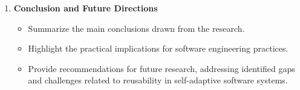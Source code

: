 \documentclass[a4paper, 12pt]{article}
\begin{document}
\begin{enumerate}
\begin{itemize}
    \end{itemize}
    \item \textbf{Conclusion and Future Directions}
    \begin{itemize}
        \item Summarize the main conclusions drawn from the research.
        \item Highlight the practical implications for software engineering practices.
        \item Provide recommendations for future research, addressing identified gaps and challenges related to reusability in self-adaptive software systems.
    \end{itemize}
\end{enumerate}
\end{document}
